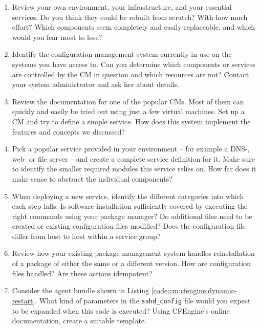 \begin{enumerate}

\item

Review your own environment, your infrastructure, and
your essential services.  Do you think they could be
rebuilt from scratch?  With how much effort?  Which
components seem completely and easily replaceable, and
which would you fear most to lose?

\item

Identify the configuration management system currently
in use on the systems you have access to.  Can you
determine which components or services are controlled
by the CM in question and which resources are not?
Contact your system administrator and ask her about
details.

\item

Review the documentation for one of the popular CMs.
Most of them can quickly and easily be tried out using
just a few virtual machines.  Set up a CM and try to
define a simple service.  How does this system
implement the features and concepts we discussed?

\item

Pick a popular service provided in your environment --
for example a DNS-, web- or file server -- and create
a complete service definition for it.  Make sure to
identify the smaller required modules this service
relies on.  How far does it make sense to abstract the
individual components?

\item

When deploying a new service, identify the different
categories into which each step falls.  Is software
installation sufficiently covered by executing the
right commands using your package manager?  Do
additional files need to be created or existing
configuration files modified?  Does the configuration
file differ from host to host within a service group?

\item

Review how your existing package management system
handles reinstallation of a package of either the same
or a different version.  How are configuration files
handled?  Are these actions idempotent?

\item

Consider the agent bundle shown in Listing
\ref{code:cm:cfengine:dynamic-restart}.  What kind of
parameters in the {\tt sshd\_config} file would you
expect to be expanded when this code is executed?
Using CFEngine's online documentation, create a
suitable template.


\end{enumerate}
